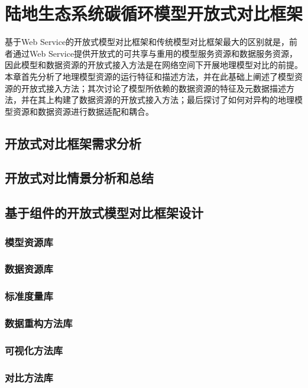 \chapter{陆地生态系统碳循环模型开放式对比框架}
基于Web Service的开放式模型对比框架和传统模型对比框架最大的区别就是，前者通过Web Service提供开放式的可共享与重用的模型服务资源和数据服务资源，因此模型和数据资源的开放式接入方法是在网络空间下开展地理模型对比的前提。本章首先分析了地理模型资源的运行特征和描述方法，并在此基础上阐述了模型资源的开放式接入方法；其次讨论了模型所依赖的数据资源的特征及元数据描述方法，并在其上构建了数据资源的开放式接入方法；最后探讨了如何对异构的地理模型资源和数据资源进行数据适配和耦合。

\section{开放式对比框架需求分析}


\section{开放式对比情景分析和总结}

\section{基于组件的开放式模型对比框架设计}

\subsection{模型资源库}
\subsection{数据资源库}
\subsection{标准度量库}
\subsection{数据重构方法库}
\subsection{可视化方法库}
\subsection{对比方法库}

